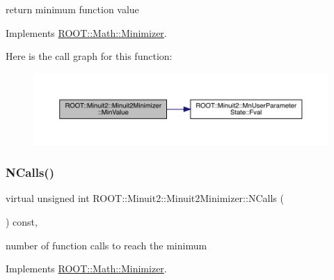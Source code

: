 return minimum function value 



Implements \mbox{\hyperlink{classROOT_1_1Math_1_1Minimizer_ae4845ff42bc0e244fdfa068c53b9a965}{R\+O\+O\+T\+::\+Math\+::\+Minimizer}}.

Here is the call graph for this function\+:
\nopagebreak
\begin{figure}[H]
\begin{center}
\leavevmode
\includegraphics[width=350pt]{d0/d9c/classROOT_1_1Minuit2_1_1Minuit2Minimizer_a4a1c7fc174527aefab3d8c87bf8c0672_cgraph}
\end{center}
\end{figure}
\mbox{\label{classROOT_1_1Minuit2_1_1Minuit2Minimizer_ab5faf7c3dc0b3743eee8352c62a6ccfd}} 
\subsubsection{\texorpdfstring{NCalls()}{NCalls()}\hspace{0.1cm}{\footnotesize\ttfamily [1/2]}}
{\footnotesize\ttfamily virtual unsigned int R\+O\+O\+T\+::\+Minuit2\+::\+Minuit2\+Minimizer\+::\+N\+Calls (\begin{DoxyParamCaption}{ }\end{DoxyParamCaption}) const\hspace{0.3cm}{\ttfamily [inline]}, {\ttfamily [virtual]}}



number of function calls to reach the minimum 



Implements \mbox{\hyperlink{classROOT_1_1Math_1_1Minimizer_abf8b2e97d47843a1fde7a54cb51c1f0e}{R\+O\+O\+T\+::\+Math\+::\+Minimizer}}.

